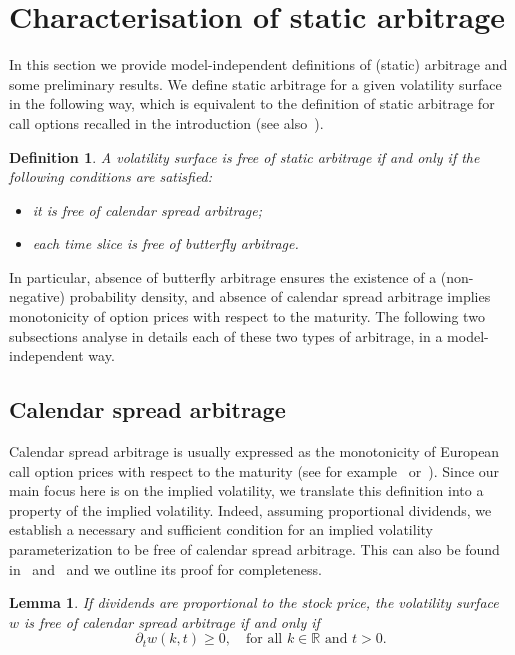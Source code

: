 \documentclass[12pt]{article}
\newtheorem{definition}{Definition}[section]
\newtheorem{lemma}{Lemma}[section]
\numberwithin{equation}{section}
\begin{document}
\section{Characterisation of static arbitrage}\label{sec:arb}
In this section we provide model-independent definitions of (static) arbitrage and some preliminary results.
We define static arbitrage for a given volatility surface in the following way, 
which is equivalent to the definition of static arbitrage for call options 
recalled in the introduction (see also~\cite{Roper}).
\begin{definition}\label{def:NoArbVol}
A volatility surface is free of static arbitrage if and only if the following conditions are satisfied:
\begin{itemize}
\item[(i)] it is free of calendar spread arbitrage;
\item[(ii)] each time slice is free of butterfly arbitrage.
\end{itemize}
\end{definition}
In particular, absence of butterfly arbitrage ensures the existence of a (non-negative) probability density, and absence of calendar spread arbitrage implies monotonicity of option prices with respect to the maturity.
The following two subsections analyse in details each of these two types of arbitrage, 
in a model-independent way.

\subsection{Calendar spread arbitrage}\label{sec:calenderSpreadArbitrage}

Calendar spread arbitrage is usually expressed as the monotonicity of European call option prices with respect to the maturity (see for example~\cite{CarrMadan} or~\cite{Cousot}).  Since our main focus here is on the implied volatility, we translate this definition into a property of the implied volatility.
Indeed, assuming proportional dividends, we establish a necessary and sufficient condition for an implied volatility parameterization to be free of calendar spread arbitrage.
This can also be found in~\cite{Fengler} and~\cite{Gatheral:2004} and we outline its proof for completeness.

\begin{lemma}\label{lem:noCalendarArb}
If dividends are proportional to the stock price, the volatility surface~$w$ is free of calendar spread arbitrage if and only if
$$
\partial _t w(k,t) \geq 0,
\quad\text{for all }k\in\mathbb{R}\text{ and }t>0.
$$
\end{lemma}
\end{document}
